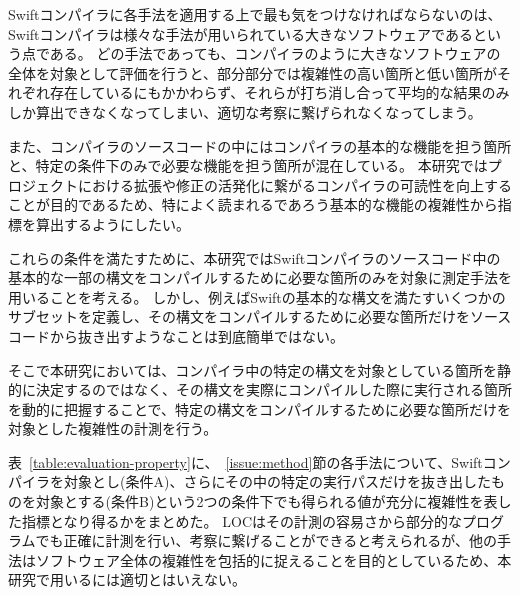 Swiftコンパイラに各手法を適用する上で最も気をつけなければならないのは、Swiftコンパイラは様々な手法が用いられている大きなソフトウェアであるという点である。
どの手法であっても、コンパイラのように大きなソフトウェアの全体を対象として評価を行うと、部分部分では複雑性の高い箇所と低い箇所がそれぞれ存在しているにもかかわらず、それらが打ち消し合って平均的な結果のみしか算出できなくなってしまい、適切な考察に繋げられなくなってしまう。

また、コンパイラのソースコードの中にはコンパイラの基本的な機能を担う箇所と、特定の条件下のみで必要な機能を担う箇所が混在している。
本研究ではプロジェクトにおける拡張や修正の活発化に繋がるコンパイラの可読性を向上することが目的であるため、特によく読まれるであろう基本的な機能の複雑性から指標を算出するようにしたい。

これらの条件を満たすために、本研究ではSwiftコンパイラのソースコード中の基本的な一部の構文をコンパイルするために必要な箇所のみを対象に測定手法を用いることを考える。
しかし、例えばSwiftの基本的な構文を満たすいくつかのサブセットを定義し、その構文をコンパイルするために必要な箇所だけをソースコードから抜き出すようなことは到底簡単ではない。

そこで本研究においては、コンパイラ中の特定の構文を対象としている箇所を静的に決定するのではなく、その構文を実際にコンパイルした際に実行される箇所を動的に把握することで、特定の構文をコンパイルするために必要な箇所だけを対象とした複雑性の計測を行う。

表~\ref{table:evaluation-property}に、~\ref{issue:method}節の各手法について、Swiftコンパイラを対象とし(条件A)、さらにその中の特定の実行パスだけを抜き出したものを対象とする(条件B)という2つの条件下でも得られる値が充分に複雑性を表した指標となり得るかをまとめた。
LOCはその計測の容易さから部分的なプログラムでも正確に計測を行い、考察に繋げることができると考えられるが、他の手法はソフトウェア全体の複雑性を包括的に捉えることを目的としているため、本研究で用いるには適切とはいえない。

